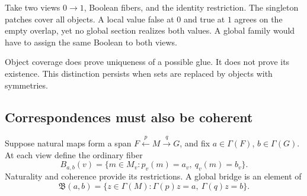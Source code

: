 \begin{example}\label{KS05}
Take two views \(0\to1\), Boolean fibers, and the identity restriction. The singleton patches cover all objects. A local value false at \(0\) and true at \(1\) agrees on the empty overlap, yet no global section realizes both values. A global family would have to assign the same Boolean to both views.
\end{example}
Object coverage does prove uniqueness of a possible glue. It does not prove its existence. This distinction persists when sets are replaced by objects with symmetries.

\subsection{Correspondences must also be coherent}
Suppose natural maps form a span \(F\xleftarrow{p}M\xrightarrow{q}G\), and fix \(a\in\Gamma(F)\), \(b\in\Gamma(G)\). At each view define the ordinary fiber
\[
 B_{a,b}(v)=\{m\in M_v:p_v(m)=a_v,\ q_v(m)=b_v\}.
\]
Naturality and coherence provide its restrictions. A global bridge is an element of
\[
 \mathfrak B(a,b)=\{z\in\Gamma(M):\Gamma(p)z=a,\ \Gamma(q)z=b\}.
\]

